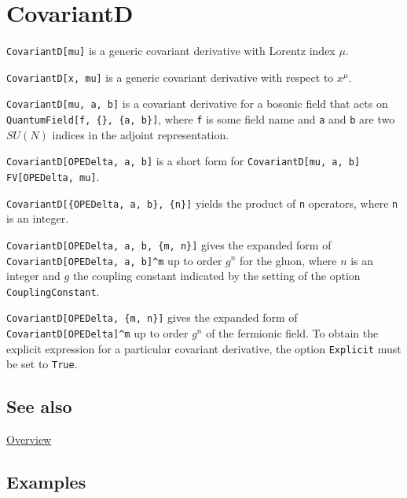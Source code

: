 \documentclass[../FeynCalcManual.tex]{subfiles}
\begin{document}
\hypertarget{covariantd}{%
\section{CovariantD}\label{covariantd}}

\texttt{CovariantD[\allowbreak{}mu]} is a generic covariant derivative
with Lorentz index \(\mu\).

\texttt{CovariantD[\allowbreak{}x,\ \allowbreak{}mu]} is a generic
covariant derivative with respect to \(x^{\mu }\).

\texttt{CovariantD[\allowbreak{}mu,\ \allowbreak{}a,\ \allowbreak{}b]}
is a covariant derivative for a bosonic field that acts on
\texttt{QuantumField[\allowbreak{}f,\ \allowbreak{}\{\allowbreak{}\},\ \allowbreak{}\{\allowbreak{}a,\ \allowbreak{}b\}]},
where \texttt{f} is some field name and \texttt{a} and \texttt{b} are
two \(SU(N)\) indices in the adjoint representation.

\texttt{CovariantD[\allowbreak{}OPEDelta,\ \allowbreak{}a,\ \allowbreak{}b]}
is a short form for
\texttt{CovariantD[\allowbreak{}mu,\ \allowbreak{}a,\ \allowbreak{}b] FV[\allowbreak{}OPEDelta,\ \allowbreak{}mu]}.

\texttt{CovariantD[\allowbreak{}\{\allowbreak{}OPEDelta,\ \allowbreak{}a,\ \allowbreak{}b\},\ \allowbreak{}\{\allowbreak{}n\}]}
yields the product of \texttt{n} operators, where \texttt{n} is an
integer.

\texttt{CovariantD[\allowbreak{}OPEDelta,\ \allowbreak{}a,\ \allowbreak{}b,\ \allowbreak{}\{\allowbreak{}m,\ \allowbreak{}n\}]}
gives the expanded form of
\texttt{CovariantD[\allowbreak{}OPEDelta,\ \allowbreak{}a,\ \allowbreak{}b]^m}
up to order \(g^n\) for the gluon, where \(n\) is an integer and \(g\)
the coupling constant indicated by the setting of the option
\texttt{CouplingConstant}.

\texttt{CovariantD[\allowbreak{}OPEDelta,\ \allowbreak{}\{\allowbreak{}m,\ \allowbreak{}n\}]}
gives the expanded form of \texttt{CovariantD[\allowbreak{}OPEDelta]^m}
up to order \(g^n\) of the fermionic field. To obtain the explicit
expression for a particular covariant derivative, the option
\texttt{Explicit} must be set to \texttt{True}.

\subsection{See also}

\hyperlink{toc}{Overview}

\subsection{Examples}
\end{document}
